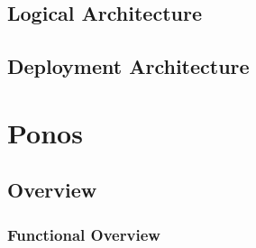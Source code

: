 \documentclass[a4paper]{book}
\begin{document}
\section{Logical Architecture}
\section{Deployment Architecture}

\chapter{Ponos}
\section{Overview}
\subsection{Functional Overview}
\end{document}
